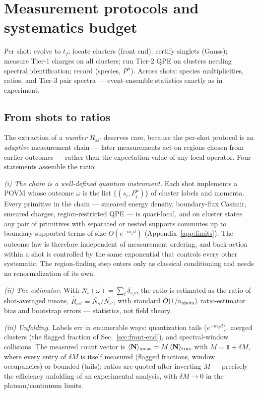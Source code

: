 \section{Measurement protocols and systematics budget}
\label{sec:protocols}

Per shot: evolve to $t_f$; locate clusters (front end); certify singlets
(Gauss); measure Tier-1 charges on all clusters; run Tier-2 QPE on
clusters needing spectral identification; record (species, $P^\mu$).
Across shots: species multiplicities, ratios, and Tier-3 pair spectra ---
event-ensemble statistics exactly as in experiment.

\subsection{From shots to ratios}
\label{sec:shots-to-ratios}

The extraction of a \emph{number} $R_{ss'}$ deserves care, because the
per-shot protocol is an \emph{adaptive} measurement chain --- later
measurements act on regions chosen from earlier outcomes --- rather
than the expectation value of any local operator.  Four statements
assemble the ratio:

\emph{(i) The chain is a well-defined quantum instrument.}  Each shot
implements a POVM whose outcome $\omega$ is the list
$\{(s_i,P^\mu_i)\}$ of cluster labels and momenta.  Every primitive in
the chain --- smeared energy density, boundary-flux Casimir, smeared
charges, region-restricted QPE --- is quasi-local, and on cluster
states any pair of primitives with separated or nested supports
commutes up to boundary-supported terms of size $O(e^{-m_\pi d})$
(Appendix~\ref{app:limits}).  The outcome law is therefore independent
of measurement ordering, and back-action within a shot is controlled
by the same exponential that controls every other systematic.  The
region-finding step enters only as classical conditioning and needs no
renormalization of its own.

\emph{(ii) The estimator.}  With $N_s(\omega)=\sum_i
\delta_{s_i s}$, the ratio is estimated as the ratio of shot-averaged
means, $\hat R_{ss'} = \overline{N_s}/\overline{N_{s'}}$, with
standard $O(1/n_{\rm shots})$ ratio-estimator bias and bootstrap
errors --- statistics, not field theory.

\emph{(iii) Unfolding.}  Labels err in enumerable ways: quantization
tails ($e^{-m_\pi d}$), merged clusters (the flagged fraction of
Sec.~\ref{sec:front-end}), and spectral-window collisions.  The
measured count vector is $\langle \mathbf N\rangle_{\rm meas} =
M\,\langle \mathbf N\rangle_{\rm true}$ with $M = \mathbb 1 +
\delta M$, where every entry of $\delta M$ is itself measured (flagged
fractions, window occupancies) or bounded (tails); ratios are quoted
after inverting $M$ --- precisely the efficiency unfolding of an
experimental analysis, with $\delta M \to 0$ in the
plateau/continuum limits.

